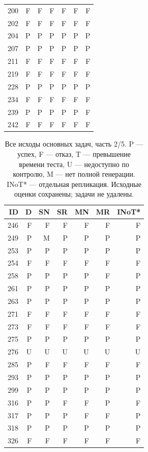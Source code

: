 \begin{table}[!htbp]
\begin{tabular*}{\textwidth}{@{\extracolsep{\fill}}rrrrrrr}
200 & F & F & F & F & F & F\\
202 & F & F & F & F & F & F\\
204 & P & P & P & P & P & P\\
207 & P & P & P & P & P & P\\
211 & F & F & F & F & F & F\\
219 & F & F & F & F & F & F\\
228 & P & P & P & P & P & P\\
234 & F & F & F & F & F & F\\
239 & P & P & P & P & P & F\\
242 & F & F & F & F & F & F\\
\bottomrule\end{tabular*}\end{table}
\clearpage
\begin{table}[!htbp]\centering\footnotesize
\caption{Все исходы основных задач, часть 2/5. P --- успех, F --- отказ, T --- превышение времени теста, U --- недоступно по контролю, M --- нет полной генерации. INoT* --- отдельная репликация. Исходные оценки сохранены; задачи не удалены.}
\begin{tabular*}{\textwidth}{@{\extracolsep{\fill}}rrrrrrr}\toprule
ID & D & SN & SR & MN & MR & INoT*\\\midrule
246 & F & F & F & F & F & F\\
249 & P & M & P & P & P & P\\
253 & P & P & P & P & P & P\\
254 & F & F & F & F & F & F\\
258 & P & P & P & P & F & P\\
261 & P & P & P & P & P & P\\
263 & P & P & P & P & P & P\\
271 & F & F & F & F & F & F\\
273 & F & F & F & F & F & F\\
275 & P & P & P & P & P & P\\
276 & U & U & U & U & U & U\\
285 & P & F & F & F & F & F\\
293 & P & P & P & P & P & P\\
299 & P & P & P & P & P & P\\
316 & P & P & F & F & P & F\\
317 & P & P & P & F & F & P\\
318 & P & P & P & P & P & P\\
326 & F & F & F & F & F & F\\

\end{tabular*}
\end{table}
